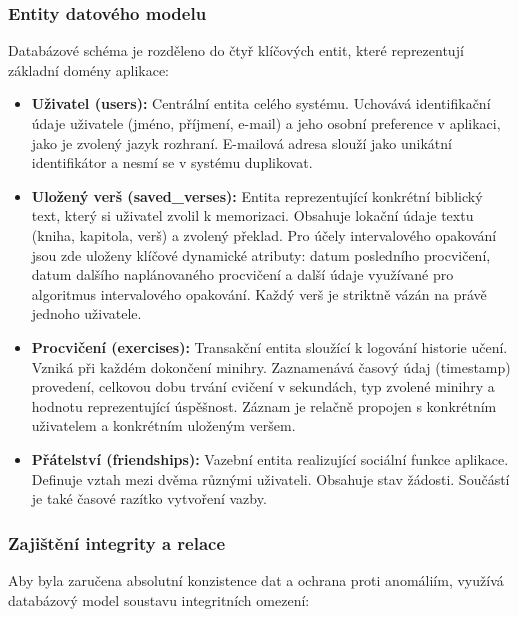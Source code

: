 \documentclass[12pt, a4paper, oneside]{article}
\begin{document}
	\subsubsection{Entity datového modelu}
	Databázové schéma je rozděleno do čtyř klíčových entit, které reprezentují základní domény aplikace:
	
	\begin{itemize}
		\item \textbf{Uživatel (users):} Centrální entita celého systému. Uchovává identifikační údaje uživatele (jméno, příjmení, e-mail) a jeho osobní preference v aplikaci, jako je zvolený jazyk rozhraní. E-mailová adresa slouží jako unikátní identifikátor a nesmí se v systému duplikovat.
		\item \textbf{Uložený verš (saved\_verses):} Entita reprezentující konkrétní biblický text, který si uživatel zvolil k memorizaci. Obsahuje lokační údaje textu (kniha, kapitola, verš) a zvolený překlad. Pro účely intervalového opakování jsou zde uloženy klíčové dynamické atributy: datum posledního procvičení, datum dalšího naplánovaného procvičení a další údaje využívané pro algoritmus intervalového opakování. Každý verš je striktně vázán na právě jednoho uživatele.
		\item \textbf{Procvičení (exercises):} Transakční entita sloužící k logování historie učení. Vzniká při každém dokončení minihry. Zaznamenává časový údaj (timestamp) provedení, celkovou dobu trvání cvičení v sekundách, typ zvolené minihry a hodnotu reprezentující úspěšnost. Záznam je relačně propojen s konkrétním uživatelem a konkrétním uloženým veršem.
		\item \textbf{Přátelství (friendships):} Vazební entita realizující sociální funkce aplikace. Definuje vztah mezi dvěma různými uživateli. Obsahuje stav žádosti. Součástí je také časové razítko vytvoření vazby.
	\end{itemize}
	
	\subsubsection{Zajištění integrity a relace}
	Aby byla zaručena absolutní konzistence dat a ochrana proti anomáliím, využívá databázový model soustavu integritních omezení:
	
\end{document}
